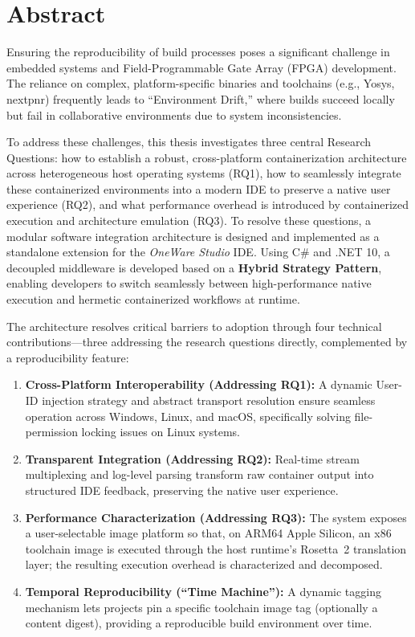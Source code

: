 
\chapter*{Abstract}

Ensuring the reproducibility of build processes poses a significant challenge in embedded systems and Field-Programmable Gate Array (FPGA) development. The reliance on complex, platform-specific binaries and toolchains (e.g., Yosys, nextpnr) frequently leads to ``Environment Drift,'' where builds succeed locally but fail in collaborative environments due to system inconsistencies.

To address these challenges, this thesis investigates three central Research Questions: how to establish a robust, cross-platform containerization architecture across heterogeneous host operating systems (RQ1), how to seamlessly integrate these containerized environments into a modern IDE to preserve a native user experience (RQ2), and what performance overhead is introduced by containerized execution and architecture emulation (RQ3). To resolve these questions, a modular software integration architecture is designed and implemented as a standalone extension for the \textit{OneWare Studio} IDE. Using C\# and .NET 10, a decoupled middleware is developed based on a \textbf{Hybrid Strategy Pattern}, enabling developers to switch seamlessly between high-performance native execution and hermetic containerized workflows at runtime.

The architecture resolves critical barriers to adoption through four technical contributions---three addressing the research questions directly, complemented by a reproducibility feature:
\begin{enumerate}
    \item \textbf{Cross-Platform Interoperability (Addressing RQ1):} A dynamic User-ID injection strategy and abstract transport resolution ensure seamless operation across Windows, Linux, and macOS, specifically solving file-permission locking issues on Linux systems.
    \item \textbf{Transparent Integration (Addressing RQ2):} Real-time stream multiplexing and log-level parsing transform raw container output into structured IDE feedback, preserving the native user experience.
    \item \textbf{Performance Characterization (Addressing RQ3):} The system exposes a user-selectable image platform so that, on ARM64 Apple Silicon, an x86 toolchain image is executed through the host runtime's Rosetta~2 translation layer; the resulting execution overhead is characterized and decomposed.
    \item \textbf{Temporal Reproducibility (``Time Machine''):} A dynamic tagging mechanism lets projects pin a specific toolchain image tag (optionally a content digest), providing a reproducible build environment over time.
\end{enumerate}

